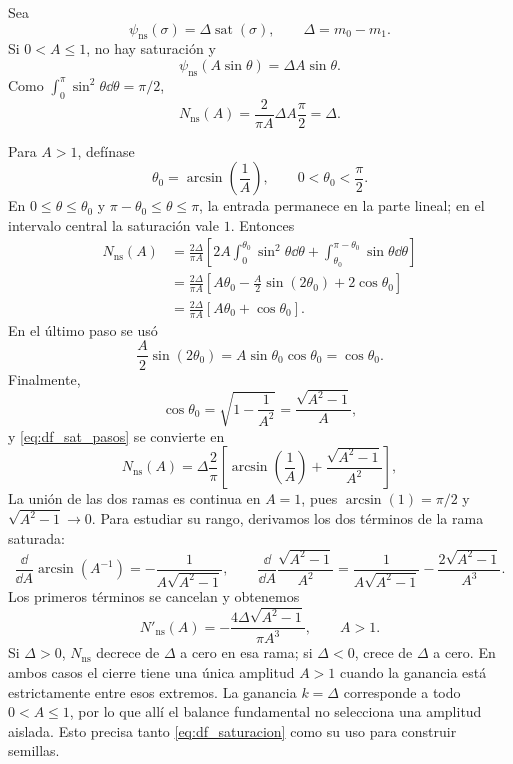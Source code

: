 Sea
\[
\psi_{\mathrm{ns}}(\sigma)=\Delta\operatorname{sat}(\sigma),
\qquad \Delta=m_0-m_1.
\]
Si \(0<A\leq1\), no hay saturación y
\[
\psi_{\mathrm{ns}}(A\sin\theta)=\Delta A\sin\theta.
\]
Como \(\int_0^\pi\sin^2\theta\dd\theta=\pi/2\),
\[
N_{\mathrm{ns}}(A)
=\frac{2}{\pi A}\Delta A\frac{\pi}{2}
=\Delta.
\]

Para \(A>1\), defínase
\[
\theta_0=\arcsin\left(\frac1A\right),
\qquad 0<\theta_0<\frac{\pi}{2}.
\]
En \(0\leq\theta\leq\theta_0\) y
\(\pi-\theta_0\leq\theta\leq\pi\), la entrada permanece en la parte lineal;
en el intervalo central la saturación vale \(1\). Entonces
\begin{align}
N_{\mathrm{ns}}(A)
&=\frac{2\Delta}{\pi A}
\left[
2A\int_0^{\theta_0}\sin^2\theta\dd\theta
+\int_{\theta_0}^{\pi-\theta_0}\sin\theta\dd\theta
\right]\nonumber\\
&=\frac{2\Delta}{\pi A}
\left[
A\theta_0-\frac{A}{2}\sin(2\theta_0)
+2\cos\theta_0
\right]\nonumber\\
&=\frac{2\Delta}{\pi A}
\left[A\theta_0+\cos\theta_0\right].
\label{eq:df_sat_pasos}
\end{align}
En el último paso se usó
\[
\frac{A}{2}\sin(2\theta_0)
=A\sin\theta_0\cos\theta_0
=\cos\theta_0.
\]
Finalmente,
\[
\cos\theta_0
=\sqrt{1-\frac1{A^2}}
=\frac{\sqrt{A^2-1}}{A},
\]
y \cref{eq:df_sat_pasos} se convierte en
\[
N_{\mathrm{ns}}(A)
=\Delta\frac{2}{\pi}
\left[
\arcsin\left(\frac1A\right)
+\frac{\sqrt{A^2-1}}{A^2}
\right],
\]
La unión de las dos ramas es continua en \(A=1\), pues
\(\arcsin(1)=\pi/2\) y \(\sqrt{A^2-1}\to0\). Para estudiar su rango,
derivamos los dos términos de la rama saturada:
\[
 \frac{\dd}{\dd A}\arcsin(A^{-1})=-\frac1{A\sqrt{A^2-1}},
 \qquad
 \frac{\dd}{\dd A}\frac{\sqrt{A^2-1}}{A^2}
 =\frac1{A\sqrt{A^2-1}}-\frac{2\sqrt{A^2-1}}{A^3}.
\]
Los primeros términos se cancelan y obtenemos
\begin{equation}
 N'_{\mathrm{ns}}(A)=-\frac{4\Delta\sqrt{A^2-1}}{\pi A^3},
 \qquad A>1.
 \label{eq:df-saturacion-rango-derivada}
\end{equation}
Si \(\Delta>0\), \(N_{\mathrm{ns}}\) decrece de \(\Delta\) a cero en
esa rama; si \(\Delta<0\), crece de \(\Delta\) a cero. En ambos casos
el cierre tiene una única amplitud \(A>1\) cuando la ganancia está
estrictamente entre esos extremos. La ganancia \(k=\Delta\) corresponde
a todo \(0<A\leq1\), por lo que allí el balance fundamental no selecciona
una amplitud aislada. Esto precisa tanto \cref{eq:df_saturacion} como su
uso para construir semillas.

\fi
\ifnum{}\relax
